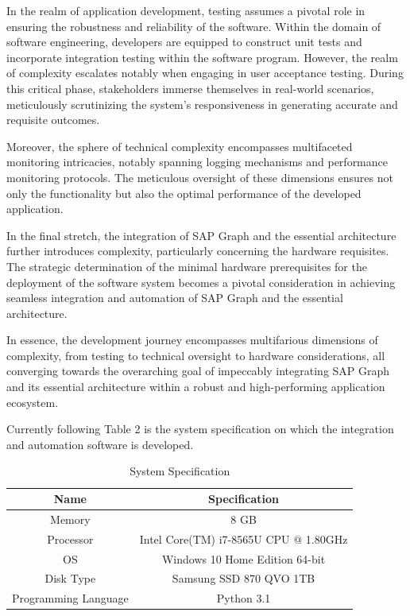 \documentclass{article}
\begin{document}
In the realm of application development, testing assumes a pivotal role in ensuring the robustness and reliability of the software. Within the domain of software engineering, developers are equipped to construct unit tests and incorporate integration testing within the software program. However, the realm of complexity escalates notably when engaging in user acceptance testing. During this critical phase, stakeholders immerse themselves in real-world scenarios, meticulously scrutinizing the system's responsiveness in generating accurate and requisite outcomes.

Moreover, the sphere of technical complexity encompasses multifaceted monitoring intricacies, notably spanning logging mechanisms and performance monitoring protocols. The meticulous oversight of these dimensions ensures not only the functionality but also the optimal performance of the developed application.

In the final stretch, the integration of SAP Graph and the essential architecture further introduces complexity, particularly concerning the hardware requisites. The strategic determination of the minimal hardware prerequisites for the deployment of the software system becomes a pivotal consideration in achieving seamless integration and automation of SAP Graph and the essential architecture.

In essence, the development journey encompasses multifarious dimensions of complexity, from testing to technical oversight to hardware considerations, all converging towards the overarching goal of impeccably integrating SAP Graph and its essential architecture within a robust and high-performing application ecosystem.

Currently following Table 2 is the system specification on which the integration and automation software is developed.


\begin{table}[ht!]
\centering
\begin{adjustbox}{width=\columnwidth,center}
\begin{tabular}{|c|c|}
\hline
\textbf{Name} & \textbf{Specification} \\
\hline
Memory & 8 GB \\
\hline
Processor & Intel Core(TM) i7-8565U CPU @ 1.80GHz \\ 
\hline
OS & Windows 10 Home Edition 64-bit \\
\hline
Disk Type & Samsung SSD 870 QVO 1TB \\
\hline
Programming Language & Python 3.1 \\
\hline
\end{tabular}
\end{adjustbox}
\caption{System Specification}
\end{table}
\end{document}
